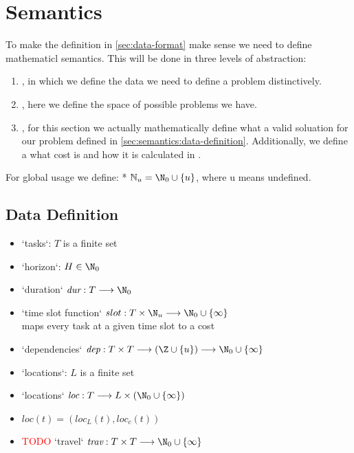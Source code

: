 \cleardoubleoddpage%
\chapter{Semantics}
\label{sec:semantics}
To make the definition in \autoref{sec:data-format} make sense we need to define mathematicl semantics. This will be done in three levels of abstraction:
\begin{enumerate}
    \item {}, in which we define the data we need to define a problem distinctively.
    \item {}, here we define the space of possible problems we have.
    \item {}, for this section we actually mathematically define what a valid soluation for our problem defined in \autoref{sec:semantics:data-definition}. Additionally, we define a what cost is and how it is calculated in .
\end{enumerate}

For global usage we define:
* $\mathbb{N}_u = \N_0 \cup \{ u \}$, where u means undefined.

\section{Data Definition}
\label{sec:semantics:data-definition}
\begin{itemize}
    \item `tasks`: $T$ is a finite set
    \item `horizon`: $H \in \N_0$
    \item `duration` $\textit{dur}: T \longrightarrow \N_0$
    \item `time slot function` $slot: T \times \N_u \longrightarrow \N_0 \cup \{ \infty \}$ \\
          maps every task at a given time slot to a cost
    \item `dependencies` $\textit{dep}: T \times T \longrightarrow (\Z \cup \{ u \}) \longrightarrow \N_0 \cup \{ \infty \}$
    \item `locations`: $L$ is a finite set
    \item `locations` $\textit{loc}: T \longrightarrow L \times (\N_0 \cup \{ \infty \})$
    \item $\textit{loc}(t) = (\textit{loc}_L(t), \textit{loc}_c(t))$
    \item \textcolor{red}{TODO} `travel` $\textit{trav}: T \times T \longrightarrow \N_0 \cup \{ \infty \}$
\end{itemize}



